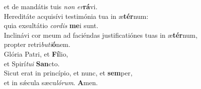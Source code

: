 \evenverse et de mandátis tuis \textit{non} \textit{er}\textbf{rá}vi.\\
\oddverse Hereditáte acquisívi testimónia tua in æ\textbf{tér}num:~\*\\
\oddverse quia exsultátio \textit{cor}\textit{dis} \textbf{me}i sunt.\\
\evenverse Inclinávi cor meum ad faciéndas justificatiónes tuas in æ\textbf{tér}num,~\*\\
\evenverse propter retri\textit{bu}\textit{ti}\textbf{ó}nem.\\
\oddverse Glória Patri, et \textbf{Fí}lio,~\*\\
\oddverse et Spirí\textit{tu}\textit{i} \textbf{San}cto.\\
\evenverse Sicut erat in princípio, et nunc, et \textbf{sem}per,~\*\\
\evenverse et in sǽcula sæcu\textit{ló}\textit{rum}. \textbf{A}men.\\

